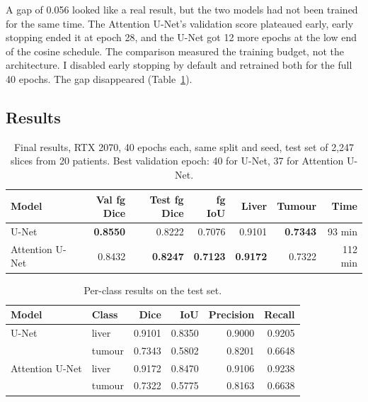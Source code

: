 \documentclass[11pt,a4paper]{article}
\begin{document}
A gap of 0.056 looked like a real result, but the two models had not been
trained for the same time. The Attention U-Net's validation score plateaued
early, early stopping ended it at epoch 28, and the U-Net got 12 more epochs at
the low end of the cosine schedule. The comparison measured the training budget,
not the architecture. I disabled early stopping by default and retrained both for
the full 40 epochs. The gap disappeared (Table~\ref{tab:seg_results}).

\subsection{Results}

\begin{table}[H]
\centering\small
\setlength{\tabcolsep}{4.5pt}
\begin{tabular}{lrrrrrr}
\toprule
\textbf{Model} & \textbf{Val fg Dice} & \textbf{Test fg Dice} & \textbf{fg IoU}
& \textbf{Liver} & \textbf{Tumour} & \textbf{Time} \\
\midrule
U-Net           & \textbf{0.8550} & 0.8222 & 0.7076 & 0.9101 & \textbf{0.7343} & 93 min \\
Attention U-Net & 0.8432 & \textbf{0.8247} & \textbf{0.7123} & \textbf{0.9172} & 0.7322 & 112 min \\
\bottomrule
\end{tabular}
\caption{Final results, RTX 2070, 40 epochs each, same split and seed, test set
of 2{,}247 slices from 20 patients. Best validation epoch: 40 for U-Net, 37 for
Attention U-Net.}
\label{tab:seg_results}
\end{table}

\begin{table}[H]
\centering\small
\begin{tabular}{llrrrr}
\toprule
\textbf{Model} & \textbf{Class} & \textbf{Dice} & \textbf{IoU} & \textbf{Precision} & \textbf{Recall} \\
\midrule
U-Net & liver  & 0.9101 & 0.8350 & 0.9000 & 0.9205 \\
      & tumour & 0.7343 & 0.5802 & 0.8201 & 0.6648 \\
\midrule
Attention U-Net & liver  & 0.9172 & 0.8470 & 0.9106 & 0.9238 \\
                & tumour & 0.7322 & 0.5775 & 0.8163 & 0.6638 \\
\bottomrule
\end{tabular}
\caption{Per-class results on the test set.}
\end{table}
\end{document}
